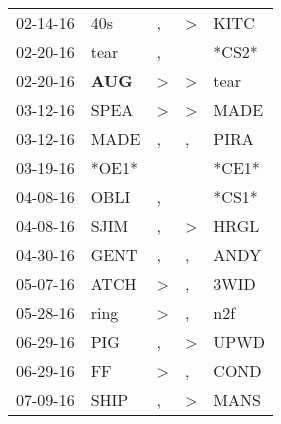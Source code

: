 \begin{supertabular}{p{0.07\textwidth}p{0.06\textwidth}p{0.02\textwidth}p{0.02\textwidth}p{0.06\textwidth}}
          02-14-16\textsuperscript{} &            40s\textsuperscript{} &                , &     \textgreater &           KITC\textsuperscript{} \\
          02-20-16\textsuperscript{} &           tear\textsuperscript{} &                , &                  &                            *CS2* \\
          02-20-16\textsuperscript{} &   \textbf{AUG\textsuperscript{}} &     \textgreater &     \textgreater &           tear\textsuperscript{} \\
          03-12-16\textsuperscript{} &           SPEA\textsuperscript{} &     \textgreater &     \textgreater &           MADE\textsuperscript{} \\
          03-12-16\textsuperscript{} &           MADE\textsuperscript{} &                , &                , &           PIRA\textsuperscript{} \\
          03-19-16\textsuperscript{} &                            *OE1* &                  &                  &                            *CE1* \\
          04-08-16\textsuperscript{} &           OBLI\textsuperscript{} &                , &                  &                            *CS1* \\
          04-08-16\textsuperscript{} &           SJIM\textsuperscript{} &                , &     \textgreater &           HRGL\textsuperscript{} \\
          04-30-16\textsuperscript{} &           GENT\textsuperscript{} &                , &                , &           ANDY\textsuperscript{} \\
          05-07-16\textsuperscript{} &           ATCH\textsuperscript{} &     \textgreater &                , &           3WID\textsuperscript{} \\
          05-28-16\textsuperscript{} &           ring\textsuperscript{} &     \textgreater &                , &            n2f\textsuperscript{} \\
          06-29-16\textsuperscript{} &            PIG\textsuperscript{} &                , &     \textgreater &           UPWD\textsuperscript{} \\
          06-29-16\textsuperscript{} &             FF\textsuperscript{} &     \textgreater &                , &           COND\textsuperscript{} \\
          07-09-16\textsuperscript{} &           SHIP\textsuperscript{} &                , &     \textgreater &           MANS\textsuperscript{} \\

\end{supertabular}
